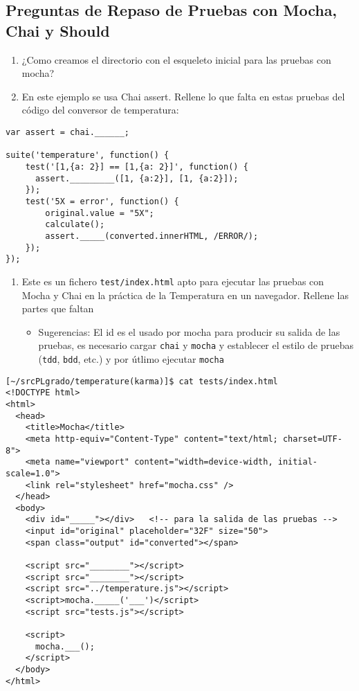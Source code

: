 \subsection{Preguntas de Repaso de Pruebas con Mocha, Chai y
Should}\label{preguntas-de-repaso-de-pruebas-con-mocha-chai-y-should}

\begin{enumerate}
\def\labelenumi{\arabic{enumi}.}
\itemsep1pt\parskip0pt
\item
  ¿Como creamos el directorio con el esqueleto inicial para las pruebas
  con mocha? 
\item
  En este ejemplo se usa Chai assert. Rellene lo que falta en estas
  pruebas del código del conversor de temperatura:
\end{enumerate}

\begin{verbatim}
var assert = chai.______;

suite('temperature', function() {
    test('[1,{a: 2}] == [1,{a: 2}]', function() {
      assert._________([1, {a:2}], [1, {a:2}]);
    });
    test('5X = error', function() {
        original.value = "5X";
        calculate();
        assert._____(converted.innerHTML, /ERROR/);
    });
});
\end{verbatim}

\begin{enumerate}
\def\labelenumi{\arabic{enumi}.}
\setcounter{enumi}{2}
\itemsep1pt\parskip0pt
\item
  Este es un fichero \texttt{test/index.html} apto para ejecutar las
  pruebas con Mocha y Chai en la práctica de la Temperatura en un
  navegador. Rellene las partes que faltan

  \begin{itemize}
  \itemsep1pt\parskip0pt
  \item
    Sugerencias: El id es el usado por mocha para producir su salida de
    las pruebas, es necesario cargar \texttt{chai} y \texttt{mocha} y
    establecer el estilo de pruebas (\texttt{tdd}, \texttt{bdd}, etc.) y
    por útlimo ejecutar \texttt{mocha}
  \end{itemize}
\end{enumerate}

\begin{verbatim}
[~/srcPLgrado/temperature(karma)]$ cat tests/index.html
<!DOCTYPE html>
<html>
  <head>
    <title>Mocha</title>
    <meta http-equiv="Content-Type" content="text/html; charset=UTF-8">
    <meta name="viewport" content="width=device-width, initial-scale=1.0">
    <link rel="stylesheet" href="mocha.css" />
  </head>
  <body>
    <div id="_____"></div>   <!-- para la salida de las pruebas -->
    <input id="original" placeholder="32F" size="50">
    <span class="output" id="converted"></span>

    <script src="________"></script>
    <script src="________"></script>
    <script src="../temperature.js"></script>
    <script>mocha._____('___')</script>
    <script src="tests.js"></script>

    <script>
      mocha.___();
    </script>
  </body>
</html>
\end{verbatim}

